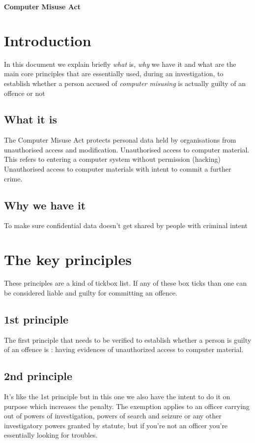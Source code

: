 \documentclass[a4paper,12pt]{article}
\begin{document}
\textbf{Computer Misuse Act}


\tableofcontents
\clearpage

 
\section{Introduction}

In this document we explain briefly \emph{what}  is, \emph{why} we have it and what are the main core principles that are essentially used, during an investigation, to establish whether a person accused of \emph{computer misusing} is actually guilty of an offence or not

 
\subsection{What it is}
The Computer Misuse Act protects personal data held by organisations from unauthorised access and modification. Unauthorised access to computer material. This refers to entering a computer system without permission (hacking) Unauthorised access to computer materials with intent to commit a further crime.


 
\subsection{Why we have it}
To make sure confidential data doesn't get shared by people with criminal intent


 
\section{The key principles}

These principles are a kind of tickbox list. If any of these box ticks than one can be considered liable and guilty for committing an offence.
 
\subsection{1st principle}
The first principle that needs to be verified to establish whether a person is guilty of an offence is : having evidences of unauthorized access to computer material.

 
\subsection{2nd principle}
It's like the 1st principle but in this one we also have the intent to do it on purpose which increases the penalty. The exemption applies to an officer carrying out of powers of investigation, powers of search and seizure or any other investigatory powers granted by statute, but if you're not an officer you're essentially looking for troubles.
\end{document}
